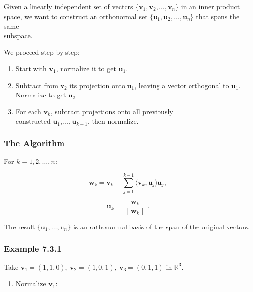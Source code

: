 \documentclass[
  12pt,
  a4paper,
]{article}
\begin{document}
Given a linearly independent set of vectors
\(\{\mathbf{v}_1, \mathbf{v}_2, \dots, \mathbf{v}_n\}\) in an inner
product\\
space, we want to construct an orthonormal set
\(\{\mathbf{u}_1, \mathbf{u}_2, \dots, \mathbf{u}_n\}\) that spans the
same\\
subspace.

We proceed step by step:

\begin{enumerate}
\def\labelenumi{\arabic{enumi}.}
\item
  Start with \(\mathbf{v}_1\), normalize it to get \(\mathbf{u}_1\).
\item
  Subtract from \(\mathbf{v}_2\) its projection onto \(\mathbf{u}_1\),
  leaving a vector orthogonal to \(\mathbf{u}_1\).\\
  Normalize to get \(\mathbf{u}_2\).
\item
  For each \(\mathbf{v}_k\), subtract projections onto all previously\\
  constructed \(\mathbf{u}_1, \dots, \mathbf{u}_{k-1}\), then normalize.
\end{enumerate}

\subsubsection{The Algorithm}\label{the-algorithm}

For \(k = 1, 2, \dots, n\):

\[\mathbf{w}_k = \mathbf{v}_k - \sum_{j=1}^{k-1} \langle \mathbf{v}_k, \mathbf{u}_j \rangle \mathbf{u}_j,\]

\[\mathbf{u}_k = \frac{\mathbf{w}_k}{\|\mathbf{w}_k\|}.\]

The result \(\{\mathbf{u}_1, \dots, \mathbf{u}_n\}\) is an orthonormal
basis of the span of the original vectors.

\subsubsection{Example 7.3.1}\label{example-731}

Take
\(\mathbf{v}_1 = (1,1,0), \ \mathbf{v}_2 = (1,0,1), \ \mathbf{v}_3 = (0,1,1)\)
in \(\mathbb{R}^3\).

\begin{enumerate}
\def\labelenumi{\arabic{enumi}.}
\item
  Normalize \(\mathbf{v}_1\):
\end{enumerate}
\end{document}
